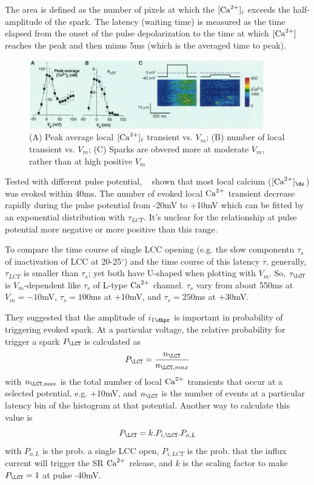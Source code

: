 \begin{framed}
The area is defined as the number of pixels at which the $[{\text{Ca}^{2+}}]_i$ exceeds the
half-amplitude of the spark. The latency (waiting time) is measured as the time
elapsed from the onset of the pulse depolarization to the time at which
$[{\text{Ca}^{2+}}]$ reaches the peak and then minus 5ms (which is the averaged time to
peak). 
\end{framed}

\begin{figure}[hbt]
  \centerline{\includegraphics[height=3cm,
    angle=0]{./images/lopez-lopez_spark1995.eps}}
  \caption{(A) Peak average local $[{\text{Ca}^{2+}}]_i$ transient vs. $V_m$; (B) number of
  local transient vs. $V_m$; (C) Sparks are obvered more at moderate $V_m$,
  rather than at high positive $V_m$}
  \label{fig:lopez-lopez_spark1995}
\end{figure}

Tested with different pulse potential, ~\citep{lopez-lopez1995} shown that most
local calcium ($[\Ca]_\ds$) was evoked within 40ms. The number of evoked local
${\text{Ca}^{2+}}$ transient decrease rapidly during the pulse potential from -20mV to +10mV
which can be fitted by an exponential distribution with $\tau_{LCT}$. It's
unclear for the relationship at pulse potential more negative or more positive
than this range. 

To compare the time course of single LCC opening (e.g. the slow componentn
$\tau_s$ of inactivation of LCC at 20-25$^\circ$) and the time course of this
latency $\tau$, generally, $\tau_{LCT}$ is smaller than $\tau_s$; yet both have
U-shaped when plotting with $V_m$. So, $\tau_\LCT$ is $V_m$-dependent like
$\tau_s$ of L-type ${\text{Ca}^{2+}}$ channel. $\tau_s$ vary from about 550ms at $V_m=-10$mV,
$\tau_s=100$ms at +10mV, and $\tau_s=250$ms at +30mV.


They suggested that the amplitude of $i_{1\dhpr}$ is important in probability of
triggering evoked spark. At a particular voltage, the relative probability for
trigger a spark $P_\LCT$ is calculated as
\begin{equation}
  \label{eq:1420}
  P_\LCT = \frac{n_\LCT}{n_{\LCT,max}}
\end{equation}
with $n_{\LCT,\max}$ is the total number of local ${\text{Ca}^{2+}}$ transients
that occur at a selected potential, e.g. +10mV, and $n_\LCT$ is the number of
events at a particular latency bin of the histogram at that potential.
Another way to calculate this value is
\begin{equation}
  \label{eq:1421}
  P_\LCT = k . P_{i,\LCT}.P_{o,L}
\end{equation}
with $P_{o,L}$ is the prob. a single LCC open, $P_{i,LCT}$ is the
prob. that the influx current will trigger the SR ${\text{Ca}^{2+}}$ release, and
$k$ is the scaling factor to make $P_\LCT = 1$ at pulse -40mV.

